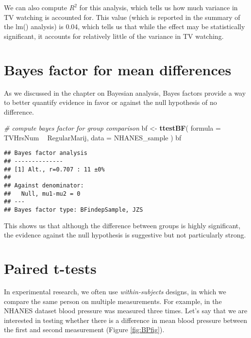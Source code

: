 \documentclass[]{book}
\newenvironment{Shaded}{\begin{snugshade}}{\end{snugshade}}
\newcommand{\KeywordTok}[1]{\textcolor[rgb]{0.13,0.29,0.53}{\textbf{#1}}}
\newcommand{\DataTypeTok}[1]{\textcolor[rgb]{0.13,0.29,0.53}{#1}}
\newcommand{\StringTok}[1]{\textcolor[rgb]{0.31,0.60,0.02}{#1}}
\newcommand{\CommentTok}[1]{\textcolor[rgb]{0.56,0.35,0.01}{\textit{#1}}}
\newcommand{\OperatorTok}[1]{\textcolor[rgb]{0.81,0.36,0.00}{\textbf{#1}}}
\newcommand{\NormalTok}[1]{#1}
\theoremstyle{definition}
\theoremstyle{definition}
\theoremstyle{definition}
\theoremstyle{remark}
\begin{document}
We can also compute \(R^2\) for this analysis, which tells us how much
variance in TV watching is accounted for. This value (which is reported
in the summary of the lm() analysis) is 0.04, which tells us that while
the effect may be statistically significant, it accounts for relatively
little of the variance in TV watching.

\section{Bayes factor for mean
differences}\label{bayes-factor-for-mean-differences}

As we discussed in the chapter on Bayesian analysis, Bayes factors
provide a way to better quantify evidence in favor or against the null
hypothesis of no difference.

\begin{Shaded}
\begin{Highlighting}[]
\CommentTok{# compute bayes factor for group comparison}
\NormalTok{bf <-}\StringTok{ }\KeywordTok{ttestBF}\NormalTok{(}
  \DataTypeTok{formula =}\NormalTok{ TVHrsNum }\OperatorTok{~}\StringTok{ }\NormalTok{RegularMarij, }
  \DataTypeTok{data =}\NormalTok{ NHANES_sample}
\NormalTok{)}
\NormalTok{bf}
\end{Highlighting}
\end{Shaded}

\begin{verbatim}
## Bayes factor analysis
## --------------
## [1] Alt., r=0.707 : 11 ±0%
## 
## Against denominator:
##   Null, mu1-mu2 = 0 
## ---
## Bayes factor type: BFindepSample, JZS
\end{verbatim}

This shows us that although the difference between groups is highly
significant, the evidence against the null hypothesis is suggestive but
not particularly strong.

\section{Paired t-tests}\label{paired-t-tests}

In experimental research, we often use \emph{within-subjects} designs,
in which we compare the same person on multiple measurements. For
example, in the NHANES dataset blood pressure was measured three times.
Let's say that we are interested in testing whether there is a
difference in mean blood pressure between the first and second
measurement (Figure \ref{fig:BPfig}).
\end{document}

